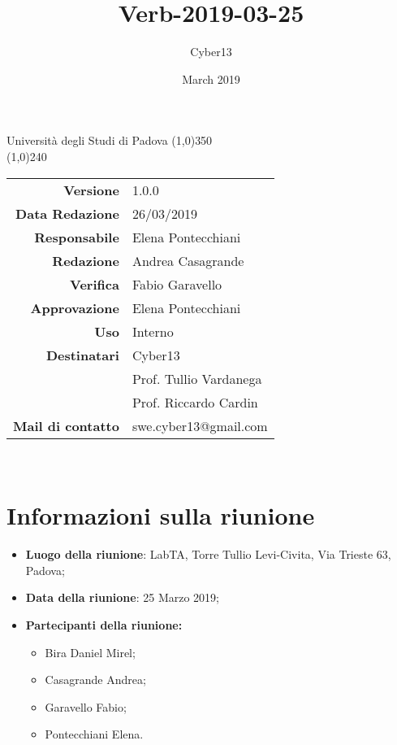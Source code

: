 \documentclass[a4paper, 12pt]{article}
\title{Verb-2019-03-25}
\author{Cyber13}
\date{March 2019}
\begin{document}
	\begin{titlepage}
		\centering Università degli Studi di Padova
		\line(1,0){350}\\
		\vspace{1.2cm}
		\logo
		\vspace{1.0cm}
		\vspace{0.5cm}
		\vspace{0.5cm}
		\line(1,0){240}\\
		\begin{tabular}{r|l}
			{\textbf{Versione}} 			& 1.0.0\\
			{\textbf{Data Redazione}} 	& 26/03/2019\\	%
			{\textbf{Responsabile}} 	& Elena Pontecchiani\\	%
			{\textbf{Redazione}} 		& Andrea Casagrande\\ 
			{\textbf{Verifica}} 			& Fabio Garavello\\
			{\textbf{Approvazione}} 		& Elena Pontecchiani\\
			{\textbf{Uso}} 				& Interno\\
			{\textbf{Destinatari}} 	& Cyber13\\ & Prof. Tullio Vardanega\\ & Prof. Riccardo Cardin\\
			{\textbf{Mail di contatto}} 	& swe.cyber13@gmail.com\\
		\end{tabular}\\
	\end{titlepage}

	\newpage

\newpage
		



	\newpage
		\tableofcontents
	    	\newpage
        	\section{Informazioni sulla riunione}
\begin{itemize}
	\item \textbf{Luogo della riunione}: LabTA, Torre Tullio Levi-Civita, Via Trieste 63, Padova;
	\item \textbf{Data della riunione}: 25 Marzo 2019;
	
	\item \textbf{Partecipanti della riunione:}
		\begin{itemize}
		    \item Bira Daniel Mirel;
		    \item Casagrande Andrea;
            \item Garavello Fabio;
            \item Pontecchiani Elena.
		\end{itemize}
\end{itemize}
\end{document}
